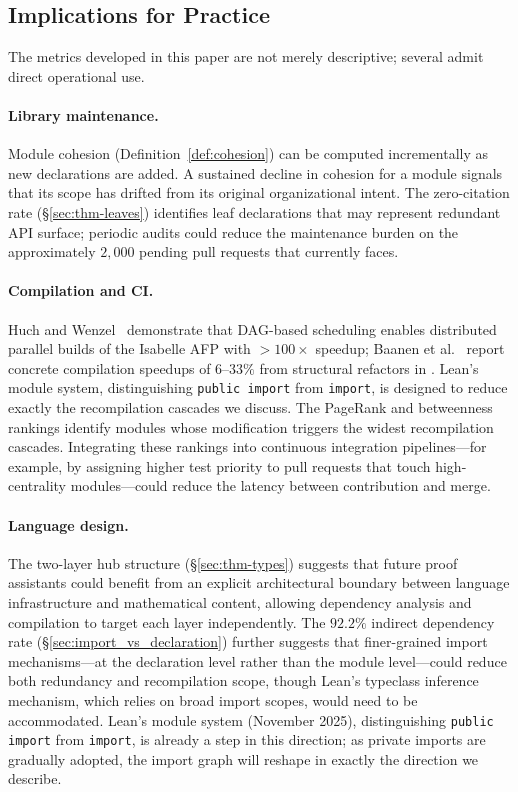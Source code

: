\subsection{Implications for Practice}
\label{sec:practice}

The metrics developed in this paper are not merely descriptive; several admit direct operational use.

\paragraph{Library maintenance.} Module cohesion (Definition~\ref{def:cohesion}) can be computed incrementally as new declarations are added. A sustained decline in cohesion for a module signals that its scope has drifted from its original organizational intent. The zero-citation rate (\S\ref{sec:thm-leaves}) identifies leaf declarations that may represent redundant API surface; periodic audits could reduce the maintenance burden on the approximately $2{,}000$ pending pull requests that  currently faces.

\paragraph{Compilation and CI.} Huch and Wenzel~\cite{huch2024} demonstrate that DAG-based scheduling enables distributed parallel builds of the Isabelle AFP with ${>}100\times$ speedup; Baanen et al.~\cite{baanen2025} report concrete compilation speedups of $6$--$33\%$ from structural refactors in . Lean's module system, distinguishing \texttt{public import} from \texttt{import}, is designed to reduce exactly the recompilation cascades we discuss. The PageRank and betweenness rankings identify modules whose modification triggers the widest recompilation cascades. Integrating these rankings into continuous integration pipelines---for example, by assigning higher test priority to pull requests that touch high-centrality modules---could reduce the latency between contribution and merge.

\paragraph{Language design.} The two-layer hub structure (\S\ref{sec:thm-types}) suggests that future proof assistants could benefit from an explicit architectural boundary between language infrastructure and mathematical content, allowing dependency analysis and compilation to target each layer independently. The $92.2\%$ indirect dependency rate (\S\ref{sec:import_vs_declaration}) further suggests that finer-grained import mechanisms---at the declaration level rather than the module level---could reduce both redundancy and recompilation scope, though Lean's typeclass inference mechanism, which relies on broad import scopes, would need to be accommodated. Lean's module system (November 2025), distinguishing \texttt{public import} from \texttt{import}, is already a step in this direction; as private imports are gradually adopted, the import graph will reshape in exactly the direction we describe.

